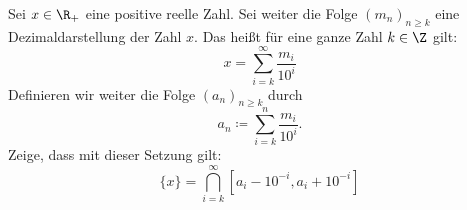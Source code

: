 \begin{exercise}
  Sei $x \in \R_+$ eine positive reelle Zahl. Sei weiter die Folge
  $(m_n)_{n \geq k}$ eine Dezimaldarstellung der Zahl $x$. Das heißt für eine
  ganze Zahl $k \in \Z$ gilt:
  \[
    x = \sum_{i = k}^\infty \frac{m_i}{10^i}
  \]
  Definieren wir weiter die Folge $(a_n)_{n \geq k}$ durch
  \[
    a_n \coloneqq \sum_{i = k}^n \frac{m_i}{10^i}.
  \]
  Zeige, dass mit dieser Setzung gilt:
  \[
    \{x\}
    =
    \bigcap_{i = k}^\infty \left[ a_i - 10^{-i}, a_i + 10^{-i} \right]
  \]
\end{exercise}
